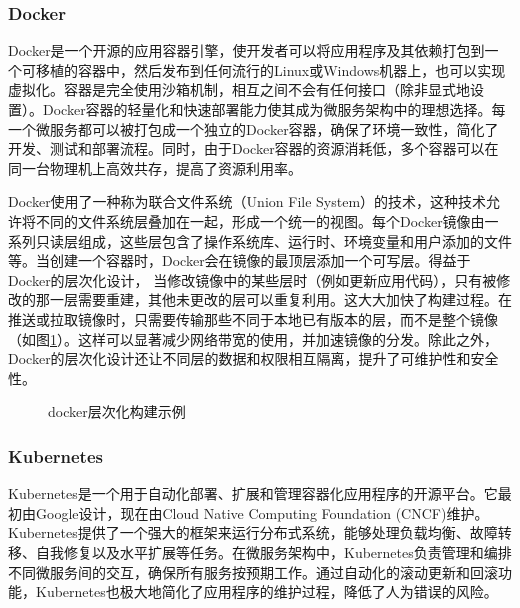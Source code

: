 \documentclass[UTF8,a4paper,12pt]{ctexart}
\numberwithin{equation}{section}
\begin{document}
\subsubsection{Docker}
Docker是一个开源的应用容器引擎，使开发者可以将应用程序及其依赖打包到一个可移植的容器中，然后发布到任何流行的Linux或Windows机器上，也可以实现虚拟化。容器是完全使用沙箱机制，相互之间不会有任何接口（除非显式地设置）。Docker容器的轻量化和快速部署能力使其成为微服务架构中的理想选择。每一个微服务都可以被打包成一个独立的Docker容器，确保了环境一致性，简化了开发、测试和部署流程。同时，由于Docker容器的资源消耗低，多个容器可以在同一台物理机上高效共存，提高了资源利用率。\par
Docker使用了一种称为联合文件系统（Union File System）的技术，这种技术允许将不同的文件系统层叠加在一起，形成一个统一的视图。每个Docker镜像由一系列只读层组成，这些层包含了操作系统库、运行时、环境变量和用户添加的文件等。当创建一个容器时，Docker会在镜像的最顶层添加一个可写层。得益于Docker的层次化设计， 当修改镜像中的某些层时（例如更新应用代码），只有被修改的那一层需要重建，其他未更改的层可以重复利用。这大大加快了构建过程。在推送或拉取镜像时，只需要传输那些不同于本地已有版本的层，而不是整个镜像（如图\ref{docker}）。这样可以显著减少网络带宽的使用，并加速镜像的分发。除此之外，Docker的层次化设计还让不同层的数据和权限相互隔离，提升了可维护性和安全性。
\begin{figure}[H]
	\caption{docker层次化构建示例}
	\label{docker}
\end{figure}


\subsubsection{Kubernetes}
Kubernetes是一个用于自动化部署、扩展和管理容器化应用程序的开源平台。它最初由Google设计，现在由Cloud Native Computing Foundation (CNCF)维护。Kubernetes提供了一个强大的框架来运行分布式系统，能够处理负载均衡、故障转移、自我修复以及水平扩展等任务。在微服务架构中，Kubernetes负责管理和编排不同微服务间的交互，确保所有服务按预期工作。通过自动化的滚动更新和回滚功能，Kubernetes也极大地简化了应用程序的维护过程，降低了人为错误的风险。
\end{document}
